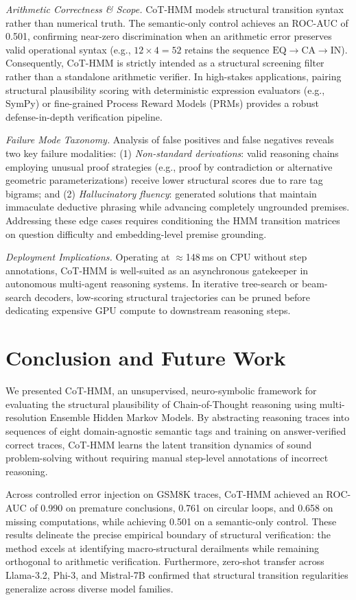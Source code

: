 \documentclass[conference]{IEEEtran}
\begin{document}
\textit{Arithmetic Correctness \& Scope.} CoT-HMM models structural transition syntax rather than numerical truth. The semantic-only control achieves an ROC-AUC of 0.501, confirming near-zero discrimination when an arithmetic error preserves valid operational syntax (e.g., $12 \times 4 = 52$ retains the sequence $\text{EQ} \to \text{CA} \to \text{IN}$). Consequently, CoT-HMM is strictly intended as a structural screening filter rather than a standalone arithmetic verifier. In high-stakes applications, pairing structural plausibility scoring with deterministic expression evaluators (e.g., SymPy) or fine-grained Process Reward Models (PRMs) provides a robust defense-in-depth verification pipeline.

\textit{Failure Mode Taxonomy.} Analysis of false positives and false negatives reveals two key failure modalities: (1) \textit{Non-standard derivations}: valid reasoning chains employing unusual proof strategies (e.g., proof by contradiction or alternative geometric parameterizations) receive lower structural scores due to rare tag bigrams; and (2) \textit{Hallucinatory fluency}: generated solutions that maintain immaculate deductive phrasing while advancing completely ungrounded premises. Addressing these edge cases requires conditioning the HMM transition matrices on question difficulty and embedding-level premise grounding.

\textit{Deployment Implications.} Operating at $\approx$148\,ms on CPU without step annotations, CoT-HMM is well-suited as an asynchronous gatekeeper in autonomous multi-agent reasoning systems. In iterative tree-search or beam-search decoders, low-scoring structural trajectories can be pruned before dedicating expensive GPU compute to downstream reasoning steps.

\section{Conclusion and Future Work}

We presented CoT-HMM, an unsupervised, neuro-symbolic framework for evaluating the structural plausibility of Chain-of-Thought reasoning using multi-resolution Ensemble Hidden Markov Models. By abstracting reasoning traces into sequences of eight domain-agnostic semantic tags and training on answer-verified correct traces, CoT-HMM learns the latent transition dynamics of sound problem-solving without requiring manual step-level annotations of incorrect reasoning. 

Across controlled error injection on GSM8K traces, CoT-HMM achieved an ROC-AUC of 0.990 on premature conclusions, 0.761 on circular loops, and 0.658 on missing computations, while achieving 0.501 on a semantic-only control. These results delineate the precise empirical boundary of structural verification: the method excels at identifying macro-structural derailments while remaining orthogonal to arithmetic verification. Furthermore, zero-shot transfer across Llama-3.2, Phi-3, and Mistral-7B confirmed that structural transition regularities generalize across diverse model families.
\end{document}
